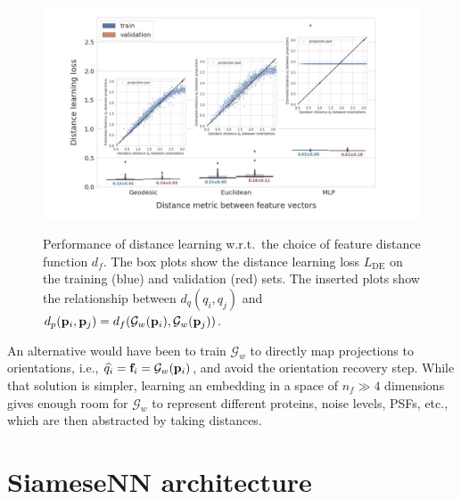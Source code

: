 \begin{figure}
    \centering
    \includegraphics[height=7cm]{figures/geo_eucl_mlp_distance_metric.pdf}
    \caption{
        Performance of distance learning w.r.t.\ the choice of feature distance function $d_f$.
        The box plots show the distance learning loss $L_\text{DE}$  on the training (blue) and validation (red) sets.
        The inserted plots show the relationship between $d_q(q_i, q_j)$ and $d_p(\mathbf{p}_i, \mathbf{p}_j) = d_f(\mathcal{G}_w(\mathbf{p}_i), \mathcal{G}_w(\mathbf{p}_j))$.
    }\label{fig:geo-eucl-mlp}
\end{figure}

An alternative would have been to train $\mathcal{G}_w$ to directly map projections to orientations, i.e., $\widehat{q_i} = \mathbf{f}_i = \mathcal{G}_w(\mathbf{p}_i)$, and avoid the orientation recovery step.
While that solution is simpler, learning an embedding in a space of $n_f \gg 4$ dimensions gives enough room for $\mathcal{G}_w$ to represent different proteins, noise levels, PSFs, etc., which are then abstracted by taking distances.

\clearpage
\section{SiameseNN architecture}\label{apx:siamese-architecture}

